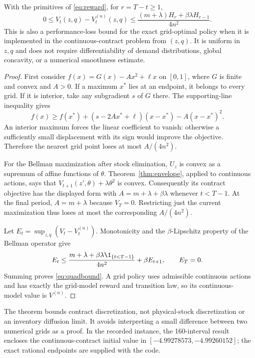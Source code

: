 \begin{theorem}\label{thm:quadratic}
With the primitives of \eqref{eq:reward}, for $r=T-t\geq1$,
\begin{equation}\label{eq:quadbound}
 0\leq V_t(z,q)-V_t^{(n)}(z,q)
 \leq\frac{(m+\lambda)H_r+\beta\lambda H_{r-1}}{4n^2}.
\end{equation}
This is also a performance-loss bound for the exact grid-optimal policy when it is implemented in the continuous-contract problem from $(z,q)$. It is uniform in $z,q$ and does not require differentiability of demand distributions, global concavity, or a numerical smoothness estimate.
\end{theorem}
\begin{proof}
First consider $f(x)=G(x)-A x^2+\ell x$ on $[0,1]$, where $G$ is finite and convex and $A>0$. If a maximum $x^*$ lies at an endpoint, it belongs to every grid. If it is interior, take any subgradient $s$ of $G$ there. The supporting-line inequality gives
\[
 f(x)\geq f(x^*)+(s-2Ax^*+\ell)(x-x^*)-A(x-x^*)^2.
\]
An interior maximum forces the linear coefficient to vanish: otherwise a sufficiently small displacement with its sign would improve the objective. Therefore the nearest grid point loses at most $A/(4n^2)$.

For the Bellman maximization after stock elimination, $U_z$ is convex as a supremum of affine functions of $\theta$. Theorem~\ref{thm:envelope}, applied to continuous actions, says that $V_{t+1}(z',\theta)+\lambda\theta^2$ is convex. Consequently its contract objective has the displayed form with $A=m+\lambda+\beta\lambda$ whenever $t<T-1$. At the final period, $A=m+\lambda$ because $V_T=0$. Restricting just the current maximization thus loses at most the corresponding $A/(4n^2)$.

Let $E_t=\sup_{z,q}(V_t-V_t^{(n)})$. Monotonicity and the $\beta$-Lipschitz property of the Bellman operator give
\[
 E_t\leq \frac{m+\lambda+\beta\lambda\1_{\{t<T-1\}}}{4n^2}
                  +\beta E_{t+1},\qquad E_T=0.
\]
Summing proves \eqref{eq:quadbound}. A grid policy uses admissible continuous actions and has exactly the grid-model reward and transition law, so its continuous-model value is $V^{(n)}$.\end{proof}

The theorem bounds contract discretization, not physical-stock discretization or an inventory diffusion limit. It avoids interpreting a small difference between two numerical grids as a proof. In the recorded instance, the 160-interval result encloses the continuous-contract initial value in $[-4.99278573,-4.99260152]$; the exact rational endpoints are supplied with the code.

